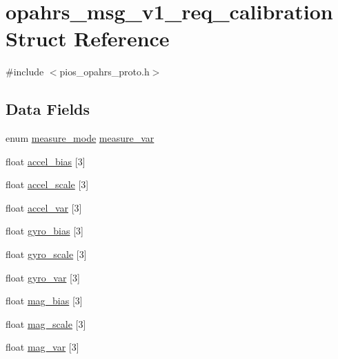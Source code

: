 \hypertarget{structopahrs__msg__v1__req__calibration}{\section{opahrs\-\_\-msg\-\_\-v1\-\_\-req\-\_\-calibration Struct Reference}
\label{structopahrs__msg__v1__req__calibration}
}


{\ttfamily \#include $<$pios\-\_\-opahrs\-\_\-proto.\-h$>$}

\subsection*{Data Fields}
\begin{DoxyCompactItemize}
\item 
enum \hyperlink{group___p_i_o_s___o_p_a_h_r_s_ga34daac5a3906b46475bde5a4075d825d}{measure\-\_\-mode} \hyperlink{structopahrs__msg__v1__req__calibration_a0a2eb9b835f504cd00eb4837cd5ddbd7}{measure\-\_\-var}
\item 
float \hyperlink{structopahrs__msg__v1__req__calibration_a860b30e7753b3069861a6a2c64a5ea02}{accel\-\_\-bias} \mbox{[}3\mbox{]}
\item 
float \hyperlink{structopahrs__msg__v1__req__calibration_a8f5ebd9dc3d4370177ea09618478e44a}{accel\-\_\-scale} \mbox{[}3\mbox{]}
\item 
float \hyperlink{structopahrs__msg__v1__req__calibration_a36d6dfc1c8faef08c1e983de4cd36dc0}{accel\-\_\-var} \mbox{[}3\mbox{]}
\item 
float \hyperlink{structopahrs__msg__v1__req__calibration_a1b56b59417cb99e78b7b484d9bcbf979}{gyro\-\_\-bias} \mbox{[}3\mbox{]}
\item 
float \hyperlink{structopahrs__msg__v1__req__calibration_a1254f496d91bf385d5b86ac13d8492db}{gyro\-\_\-scale} \mbox{[}3\mbox{]}
\item 
float \hyperlink{structopahrs__msg__v1__req__calibration_a477198c748876fb9a1409096faac0a23}{gyro\-\_\-var} \mbox{[}3\mbox{]}
\item 
float \hyperlink{structopahrs__msg__v1__req__calibration_ae5044c4ba430ed823f11ae7ba0ca813e}{mag\-\_\-bias} \mbox{[}3\mbox{]}
\item 
float \hyperlink{structopahrs__msg__v1__req__calibration_a606d427f3b8014b8122c2a6a15c6c9ab}{mag\-\_\-scale} \mbox{[}3\mbox{]}
\item 
float \hyperlink{structopahrs__msg__v1__req__calibration_ac313a31071e4ab03c170151187667035}{mag\-\_\-var} \mbox{[}3\mbox{]}
\end{DoxyCompactItemize}


